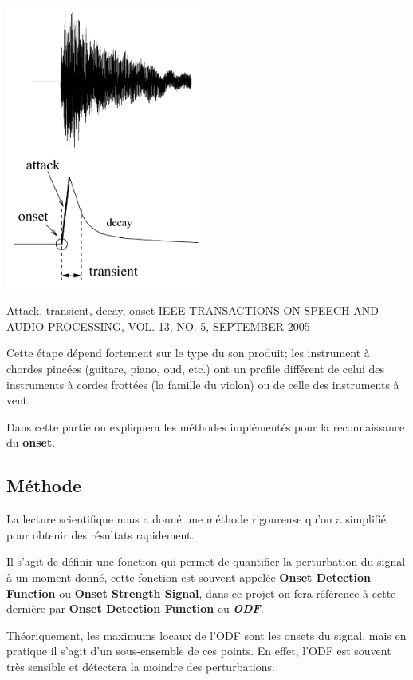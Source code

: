 \documentclass[]{article}
\begin{document}
\includegraphics[width=0.5\textwidth,height=\textheight]{img/onset.png}

Attack, transient, decay, onset IEEE TRANSACTIONS ON SPEECH AND AUDIO
PROCESSING, VOL. 13, NO. 5, SEPTEMBER 2005

Cette étape dépend fortement sur le type du son produit; les instrument
à chordes pincées (guitare, piano, oud, etc.) ont un profile différent
de celui des instruments à cordes frottées (la famille du violon) ou de
celle des instruments à vent.

Dans cette partie on expliquera les méthodes implémentés pour la
reconnaissance du \textbf{onset}.

\hypertarget{methode}{%
\subsection{Méthode}\label{methode}}

La lecture scientifique nous a donné une méthode rigoureuse qu'on a
simplifié pour obtenir des résultats rapidement.

Il s'agit de définir une fonction qui permet de quantifier la
perturbation du signal à un moment donné, cette fonction est souvent
appelée \textbf{Onset Detection Function} ou \textbf{Onset Strength
Signal}, dans ce projet on fera référence à cette dernière par
\textbf{Onset Detection Function} ou \textbf{\emph{ODF}}.

Théoriquement, les maximums locaux de l'ODF sont les onsets du signal,
mais en pratique il s'agit d'un sous-ensemble de ces points. En effet,
l'ODF est souvent très sensible et détectera la moindre des
perturbations.
\end{document}
